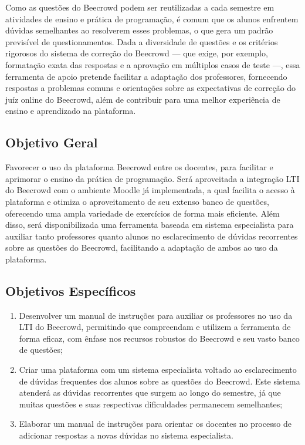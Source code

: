 Como as questões do Beecrowd podem ser reutilizadas a cada semestre em atividades de ensino e prática de programação, é comum que os alunos enfrentem dúvidas semelhantes ao resolverem esses problemas, o que gera um padrão previsível de questionamentos. Dada a diversidade de questões e os critérios rigorosos do sistema de correção do Beecrowd — que exige, por exemplo, formatação exata das respostas e a aprovação em múltiplos casos de teste —, essa ferramenta de apoio pretende facilitar a adaptação dos professores, fornecendo respostas a problemas comuns e orientações sobre as expectativas de correção do juíz online do Beecrowd, além de contribuir para uma melhor experiência de ensino e aprendizado na plataforma.

\subsection{\textbf{Objetivo Geral}}

Favorecer o uso da plataforma Beecrowd entre os docentes, para facilitar e aprimorar o ensino da prática de programação. Será aproveitada a integração LTI do Beecrowd com o ambiente Moodle já implementada, a qual facilita o acesso à plataforma e otimiza o aproveitamento de seu extenso banco de questões, oferecendo uma ampla variedade de exercícios de forma mais eficiente. Além disso, será disponibilizada uma ferramenta baseada em sistema especialista para auxiliar tanto professores quanto alunos no esclarecimento de dúvidas recorrentes sobre as questões do Beecrowd, facilitando a adaptação de ambos ao uso da plataforma.

\subsection{\textbf{Objetivos Específicos}}

\begin{enumerate}[label=(\alph*)]
    \item  Desenvolver um manual de instruções para auxiliar os professores no uso da LTI do Beecrowd, permitindo que compreendam e utilizem a ferramenta de forma eficaz, com ênfase nos recursos robustos do Beecrowd e seu vasto banco de questões;
    \item  Criar uma plataforma com um sistema especialista voltado ao esclarecimento de dúvidas frequentes dos alunos sobre as questões do Beecrowd. Este sistema atenderá as dúvidas recorrentes que surgem ao longo do semestre, já que muitas questões e suas respectivas dificuldades permanecem semelhantes;
    \item  Elaborar um manual de instruções para orientar os docentes no processo de adicionar respostas a novas dúvidas no sistema especialista.
\end{enumerate}

